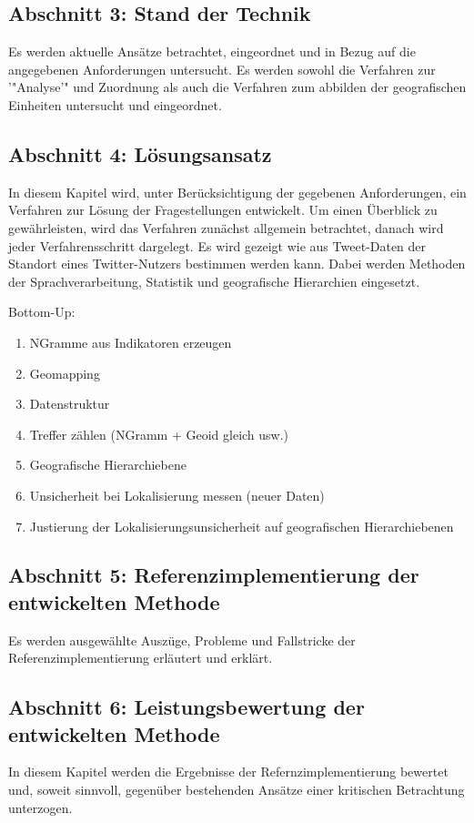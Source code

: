 		\subsection*{Abschnitt 3: Stand der Technik}
			Es werden aktuelle Ansätze betrachtet, eingeordnet und in Bezug auf die angegebenen Anforderungen untersucht.
			Es werden sowohl die Verfahren zur '"Analyse'" und Zuordnung als auch die Verfahren zum abbilden der geografischen Einheiten untersucht und eingeordnet. 

		\subsection*{Abschnitt 4: Lösungsansatz}
			In diesem Kapitel wird, unter Berücksichtigung der gegebenen Anforderungen, ein Verfahren zur Lösung der Fragestellungen entwickelt. 
			Um einen Überblick zu gewährleisten, wird das Verfahren zunächst allgemein betrachtet, danach wird jeder Verfahrensschritt dargelegt.
			Es wird gezeigt wie aus Tweet-Daten der Standort eines Twitter-Nutzers bestimmen werden kann.
			Dabei werden Methoden der Sprachverarbeitung, Statistik und geografische Hierarchien eingesetzt. 

			Bottom-Up:

			\begin{enumerate}
				\item NGramme aus Indikatoren erzeugen
				\item Geomapping
				\item Datenstruktur
				\item Treffer zählen (NGramm + Geoid gleich usw.)
				\item Geografische Hierarchiebene
				\item Unsicherheit bei Lokalisierung messen (neuer Daten) 
				\item Justierung der Lokalisierungsunsicherheit auf geografischen Hierarchiebenen
			\end{enumerate}

		\subsection*{Abschnitt 5: Referenzimplementierung der entwickelten Methode}
			Es werden ausgewählte Auszüge, Probleme und Fallstricke der Referenzimplementierung erläutert und erklärt. 

		\subsection*{Abschnitt 6: Leistungsbewertung der entwickelten Methode}
			In diesem Kapitel werden die Ergebnisse der Refernzimplementierung bewertet und, soweit sinnvoll, gegenüber bestehenden Ansätze einer kritischen Betrachtung unterzogen. 

